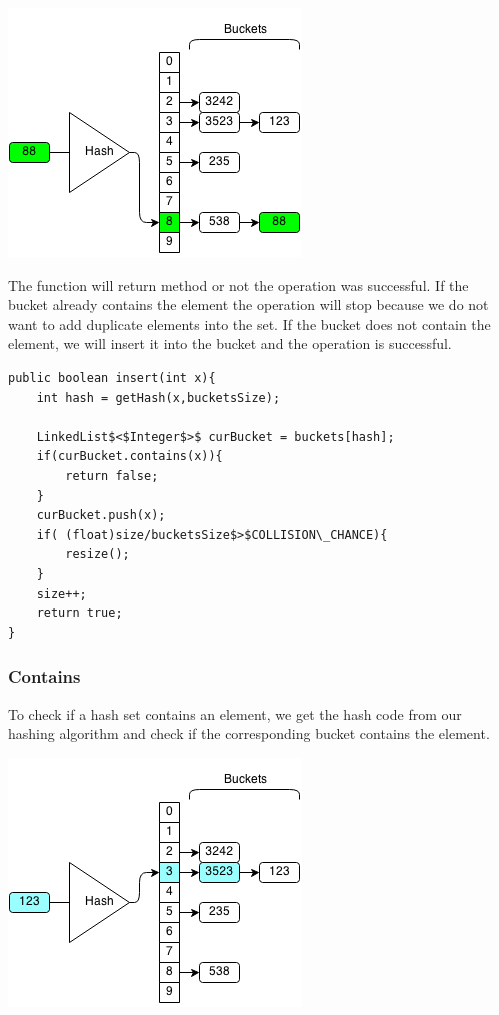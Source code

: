 \documentclass[11pt,oneside]{book}
\makeatletter
\def\maxwidth#1{\ifdim\Gin@nat@width>#1 #1\else\Gin@nat@width\fi}
\makeatother
\begin{document}
\includegraphics[width=\maxwidth{\textwidth}]{hashsetinsert.png}

The function will return method or not the operation was successful. If the bucket already contains the element the operation will stop because we do not want to add duplicate elements into the set. If the bucket does not contain the element, we will insert it into the bucket and the operation is successful.

\begin{lstlisting}
public boolean insert(int x){
    int hash = getHash(x,bucketsSize);
        
    LinkedList$<$Integer$>$ curBucket = buckets[hash];
    if(curBucket.contains(x)){
        return false;
    }
    curBucket.push(x);
    if( (float)size/bucketsSize$>$COLLISION\_CHANCE){
        resize();
    }
    size++;
    return true;
}
\end{lstlisting}

\subsubsection{Contains}

To check if a hash set contains an element, we get the hash code from our hashing algorithm and check if the corresponding bucket contains the element.

\includegraphics[width=\maxwidth{\textwidth}]{hashsetcontains.png}
\end{document}
